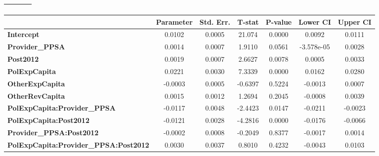 \begin{center}
\begin{tabular}{lclc}
\textbf{}                                     &                    & \textbf{                     }   &                  \\
\bottomrule
\end{tabular}
\begin{tabular}{lcccccc}
                                              & \textbf{Parameter} & \textbf{Std. Err.} & \textbf{T-stat} & \textbf{P-value} & \textbf{Lower CI} & \textbf{Upper CI}  \\
\midrule
\textbf{Intercept}                            &       0.0102       &       0.0005       &      21.074     &      0.0000      &       0.0092      &       0.0111       \\
\textbf{Provider\_PPSA}                       &       0.0014       &       0.0007       &      1.9110     &      0.0561      &     -3.578e-05    &       0.0028       \\
\textbf{Post2012}                             &       0.0019       &       0.0007       &      2.6627     &      0.0078      &       0.0005      &       0.0033       \\
\textbf{PolExpCapita}                         &       0.0221       &       0.0030       &      7.3339     &      0.0000      &       0.0162      &       0.0280       \\
\textbf{OtherExpCapita}                       &      -0.0003       &       0.0005       &     -0.6397     &      0.5224      &      -0.0013      &       0.0007       \\
\textbf{OtherRevCapita}                       &       0.0015       &       0.0012       &      1.2694     &      0.2045      &      -0.0008      &       0.0039       \\
\textbf{PolExpCapita:Provider\_PPSA}          &      -0.0117       &       0.0048       &     -2.4423     &      0.0147      &      -0.0211      &      -0.0023       \\
\textbf{PolExpCapita:Post2012}                &      -0.0121       &       0.0028       &     -4.2816     &      0.0000      &      -0.0176      &      -0.0066       \\
\textbf{Provider\_PPSA:Post2012}              &      -0.0002       &       0.0008       &     -0.2049     &      0.8377      &      -0.0017      &       0.0014       \\
\textbf{PolExpCapita:Provider\_PPSA:Post2012} &       0.0030       &       0.0037       &      0.8010     &      0.4232      &      -0.0043      &       0.0103       \\
\bottomrule
\end{tabular}
\end{center}